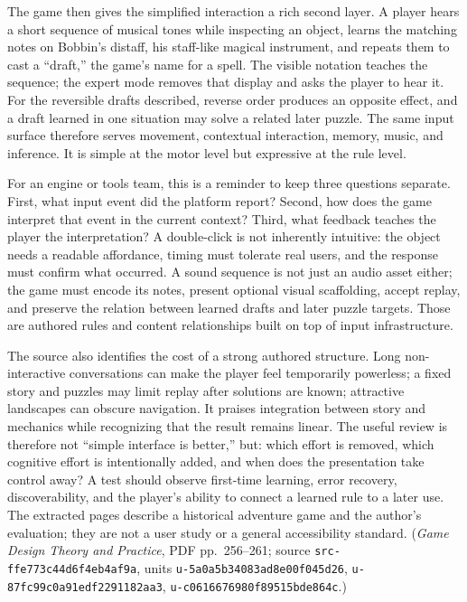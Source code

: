 The game then gives the simplified interaction a rich second layer. A player hears a short sequence of musical tones while inspecting an object, learns the matching notes on Bobbin's distaff, his staff-like magical instrument, and repeats them to cast a ``draft,'' the game's name for a spell. The visible notation teaches the sequence; the expert mode removes that display and asks the player to hear it. For the reversible drafts described, reverse order produces an opposite effect, and a draft learned in one situation may solve a related later puzzle. The same input surface therefore serves movement, contextual interaction, memory, music, and inference. It is simple at the motor level but expressive at the rule level.

For an engine or tools team, this is a reminder to keep three questions separate. First, what input event did the platform report? Second, how does the game interpret that event in the current context? Third, what feedback teaches the player the interpretation? A double-click is not inherently intuitive: the object needs a readable affordance, timing must tolerate real users, and the response must confirm what occurred. A sound sequence is not just an audio asset either; the game must encode its notes, present optional visual scaffolding, accept replay, and preserve the relation between learned drafts and later puzzle targets. Those are authored rules and content relationships built on top of input infrastructure.

The source also identifies the cost of a strong authored structure. Long non-interactive conversations can make the player feel temporarily powerless; a fixed story and puzzles may limit replay after solutions are known; attractive landscapes can obscure navigation. It praises integration between story and mechanics while recognizing that the result remains linear. The useful review is therefore not ``simple interface is better,'' but: which effort is removed, which cognitive effort is intentionally added, and when does the presentation take control away? A test should observe first-time learning, error recovery, discoverability, and the player's ability to connect a learned rule to a later use. The extracted pages describe a historical adventure game and the author's evaluation; they are not a user study or a general accessibility standard. (\emph{Game Design Theory and Practice}, PDF pp.~256--261; source \texttt{src-ffe773c44d6f4eb4af9a}, units \texttt{u-5a0a5b34083ad8e00f045d26}, \texttt{u-87fc99c0a91edf2291182aa3}, \texttt{u-c0616676980f89515bde864c}.)

